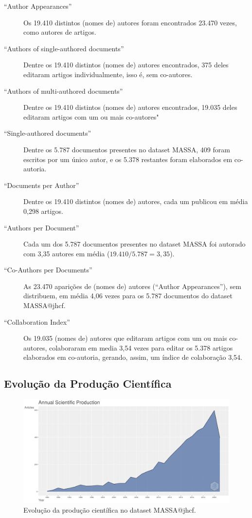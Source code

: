 \begin{description}
    \item [``Author Appearances''] Os 19.410 distintos (nomes de) autores foram encontrados 23.470 vezes, como autores de artigos.
    \item [``Authors of single-authored documents''] Dentre os 19.410 distintos (nomes de) autores encontrados, 375 deles editaram artigos individualmente, isso é, sem co-autores.
    \item [``Authors of multi-authored documents''] Dentre os 19.410 distintos (nomes de) autores encontrados, 19.035 deles editaram artigos com um ou mais co-autores"
    \item [``Single-authored documents''] Dentre os 5.787 documentos presentes no dataset MASSA, 409 foram escritos por um único autor, e os 5.378 restantes foram elaborados em co-autoria.
    \item [``Documents per Author''] Dentre os 19.410 distintos (nomes de) autores, cada um publicou em média 0,298 artigos.
    \item [``Authors per Document''] Cada um dos 5.787 documentos presentes no dataset MASSA foi autorado com 3,35 autores em média ($19.410 / 5.787 = 3,35$).
    \item [``Co-Authors per Documents''] As 23.470 aparições de (nomes de) autores (``Author Appearances''), sem distribuem, em média 4,06 vezes para os 5.787 documentos do dataset MASSA@jhcf.
    \item [``Collaboration Index''] Os 19.035 (nomes de) autores que editaram artigos com um ou mais co-autores, colaboraram em media 3,54 vezes para editar os 5.378 artigos elaborados em co-autoria, gerando, assim, um índice de colaboração 3,54. 
\end{description}

\subsection{Evolução da Produção Científica}

\begin{figure}
    \centering
    \includegraphics[width=1\textwidth]{experiments/jhcf/PesqBibliogr/Computacao Experimental/WoS-20210803/classico-mais-citacoes/Dataset/AnnualScientificProduction-2021-08-05.png}
    \caption{Evolução da produção científica no dataset MASSA@jhcf.}
    \label{fig:evol:anual:MASSA@jhcf}
\end{figure}

